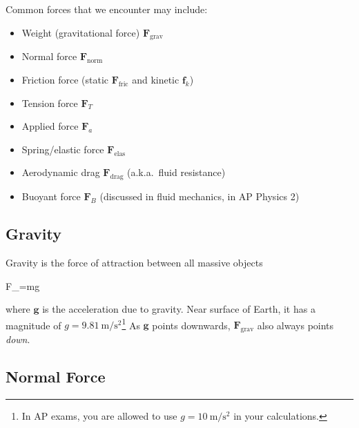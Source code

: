 Common forces that we encounter may include:
\begin{itemize}
\item Weight (gravitational force) $\bm F_\text{grav}$
\item Normal force $\bm F_\text{norm}$
\item Friction force (static $\bm F_\text{fric}$ and kinetic $\bm f_k$)
\item Tension force $\bm F_T$
\item Applied force $\bm F_a$
\item Spring/elastic force $\bm F_\text{elas}$
\item Aerodynamic drag $\bm F_\text{drag}$ (a.k.a.\ fluid resistance)
\item Buoyant force $\bm F_B$ (discussed in fluid mechanics, in AP Physics 2)
\end{itemize}




\subsection{Gravity}
Gravity is the force of attraction between all massive objects
\begin{important-equation}
  \bm F_=m\bm g
\end{important-equation}
where $\bm g$ is the acceleration due to gravity. Near surface of Earth, it
has a magnitude of $g=\SI{9.81}{\metre\per\second\squared}$\footnote{In AP
exams, you are allowed to use $g=\SI{10}{\metre\per\second\squared}$ in your
calculations.} As $\bm g$ points downwards, $\bm F_\text{grav}$ also always
points \emph{down}.



\subsection{Normal Force}

